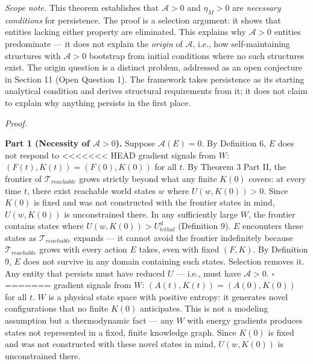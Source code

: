 \documentclass[
]{article}
\begin{document}
\emph{Scope note.} This theorem establishes that \(\mathcal{A} > 0\)
and \(\eta_M > 0\) are \emph{necessary conditions} for persistence. The
proof is a selection argument: it shows that entities lacking either
property are eliminated. This explains why \(\mathcal{A} > 0\) entities
predominate --- it does not explain the \emph{origin} of
\(\mathcal{A}\), i.e., how self-maintaining structures with
\(\mathcal{A} > 0\) bootstrap from initial conditions where no such
structures exist. The origin question is a distinct problem, addressed
as an open conjecture in Section 11 (Open Question 1). The framework
takes persistence as its starting analytical condition and derives
structural requirements from it; it does not claim to explain why
anything persists in the first place.

\emph{Proof.}

\textbf{Part 1 (Necessity of \(\mathcal{A} > 0\)).} Suppose
\(\mathcal{A}(E) = 0\). By Definition 6, \(E\) does not respond to
<<<<<<< HEAD
gradient signals from \(W\): \((F(t), K(t)) = (F(0), K(0))\) for all
\(t\). By Theorem 3 Part II, the frontier of \(\mathcal{T}_{reachable}\)
grows strictly beyond what any finite \(K(0)\) covers: at every time
\(t\), there exist reachable world states \(w\) where
\(U(w, K(0)) > 0\). Since \(K(0)\) is fixed and was not constructed with
the frontier states in mind, \(U(w, K(0))\) is unconstrained there. In
any sufficiently large \(W\), the frontier contains states where
\(U(w, K(0)) > U_{lethal}^d\) (Definition 9). \(E\) encounters these
states as \(\mathcal{T}_{reachable}\) expands --- it cannot avoid the
frontier indefinitely because \(\mathcal{T}_{reachable}\) grows with
every action \(E\) takes, even with fixed \((F,K)\). By Definition 9,
\(E\) does not survive in any domain containing such states. Selection
removes it. Any entity that persists must have reduced \(U\) --- i.e.,
must have \(\mathcal{A} > 0\). \(\square\)
=======
gradient signals from \(W\): \((A(t), K(t)) = (A(0), K(0))\) for all
\(t\). \(W\) is a physical state space with positive entropy: it
generates novel configurations that no finite \(K(0)\) anticipates. This
is not a modeling assumption but a thermodynamic fact --- any \(W\) with
energy gradients produces states not represented in a fixed, finite
knowledge graph. Since \(K(0)\) is fixed and was not constructed with
these novel states in mind, \(U(w, K(0))\) is unconstrained there.
\end{document}
